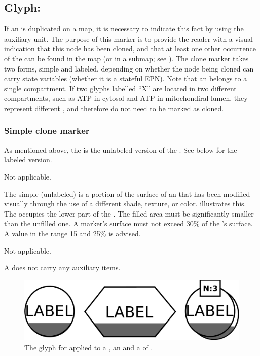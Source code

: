 
\subsection{Glyph: }
\label{sec:cloneMarker}

If an  is duplicated on a map, it is necessary to indicate this fact by using the  auxiliary unit.  The purpose of this marker is to provide the reader with a visual indication that this node has been cloned, and that at least one other occurrence of the  can be found in the map (or in a submap; see ).  The clone marker takes two forms, simple and labeled, depending on whether the node being cloned can carry state variables (\ie whether it is a stateful EPN). Note that an  belongs to a single compartment. If two glyphs labelled ``X'' are located in two different compartments, such as ATP in cytosol and ATP in mitochondiral lumen, they represent different , and therefore do not need to be marked as cloned.


\subsubsection{Simple clone marker}

As mentioned above, the  is the unlabeled version of the .  See below for the labeled version.


\begin{glyphDescription}

\glyphSboTerm Not applicable.

\glyphContainer The simple (unlabeled)  is a portion of the surface of an  that has been modified visually through the use of a different shade, texture, or color.   illustrates this.  The  occupies the lower part of the . The filled area must be significantly smaller than the unfilled one. A marker's surface must not exceed 30\% of the 's surface. A value in the range 15 and 25\% is advised.

\glyphLabel Not applicable.

\glyphAux A  does not carry any auxiliary items.

\end{glyphDescription}

\begin{figure}[H]
  \centering
  \includegraphics[scale = 0.3]{images/simpleCloneMarker}
  \caption{The \PD glyph for  applied to a , an  and a  of .}
  \label{fig:simpleCloneMarker}
\end{figure}


